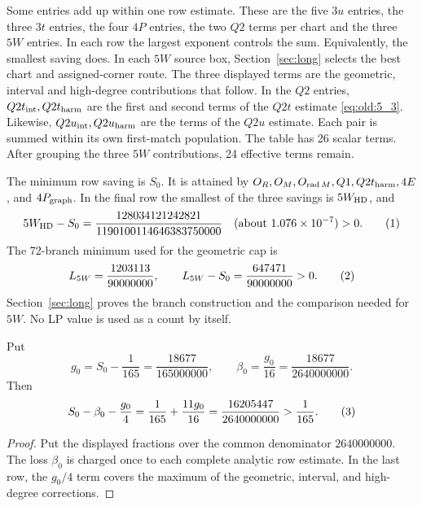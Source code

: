 Some entries add up within one row estimate. These are the five \(3u\)
entries, the three \(3t\) entries, the four \(4P\) entries, the two
\(Q2\) terms per chart and the three \(5W\) entries. In each row the
largest exponent controls the sum. Equivalently, the smallest saving does.
In each \(5W\) source box, Section~\ref{sec:long} selects the best chart
and assigned-corner route. The three displayed terms are the geometric,
interval and high-degree contributions that follow.
In the \(Q2\) entries, \(Q2t_{\rm int},Q2t_{\rm harm}\) are the first and
second terms of the \(Q2t\) estimate \eqref{eq:old:5_3}. Likewise,
\(Q2u_{\rm int},Q2u_{\rm harm}\) are the terms of the \(Q2u\) estimate.
Each pair is summed within its own first-match
population.
The table has 26 scalar terms. After grouping the three \(5W\)
contributions, 24 effective terms remain.

The minimum row saving is \(S_0\). It is attained by
\(O_R,O_M,O_{\operatorname{rad}M},Q1,Q2t_{\rm harm},4E\), and
\(4P_{\rm graph}\).
In the final row the smallest of the three savings is \(5W_{\rm HD}\), and
\[
5W_{\rm HD}-S_0=
\frac{128034121242821}{1190100114646383750000}
\quad\text{(about }1.076\times10^{-7}\text{)}>0.
\AutoTag{eq:old:8_2}
\]
The 72-branch minimum used for the geometric cap is
\[
L_{5W}=\frac{1203113}{90000000},\qquad
L_{5W}-S_0=\frac{647471}{90000000}>0.
\AutoTag{eq:old:8_3}
\]
Section~\ref{sec:long} proves the branch construction and the
comparison needed for \(5W\). No LP value is used as a count by itself.

\begin{proposition}[Reserve]\label{prop:reserve}
Put
\[
g_0=S_0-\frac1{165}=\frac{18677}{165000000},\qquad
\beta_0=\frac{g_0}{16}=\frac{18677}{2640000000}.
\]
Then
\[
S_0-\beta_0-\frac{g_0}{4}
=\frac1{165}+\frac{11g_0}{16}
=\frac{16205447}{2640000000}>\frac1{165}.
\AutoTag{eq:old:8_4}
\]
\end{proposition}

\begin{proof}
Put the displayed fractions over the common denominator
\(2640000000\). The loss \(\beta_0\) is charged once to each complete
analytic row estimate. In the last row, the \(g_0/4\) term covers the maximum of the
geometric, interval, and high-degree corrections.
\end{proof}

